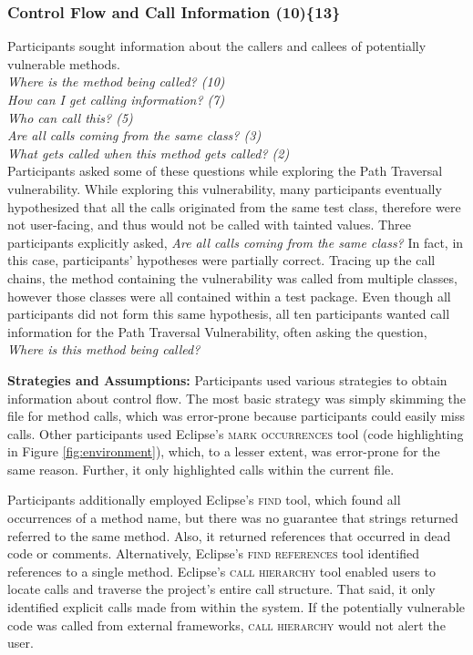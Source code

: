 \documentclass[10pt,journal,compsoc]{IEEEtran}
\begin{document}

\subsubsection{Control Flow and Call Information (10)\{13\}}\label{cf}

Participants sought information about the callers and callees of potentially vulnerable methods.
\\

\noindent\emph{Where is the method being called? (10)} \\
\emph{How can I get calling information? (7)} \\
\emph{Who can call this? (5)} \\
\emph{Are all calls coming from the same class? (3)} \\
\emph{What gets called when this method gets called? (2)}
\\

Participants asked some of these questions while exploring the Path Traversal vulnerability.
While exploring this vulnerability, many participants eventually hypothesized that all the calls originated from the same test class, therefore were not user-facing, and thus would not be called with tainted values.
Three participants explicitly asked, \textit{Are all calls coming from the same class?} 
In fact, in this case, participants' hypotheses were partially correct. 
Tracing up the call chains, the method containing the vulnerability was called from multiple classes, however those classes were all contained within a test package.
Even though all participants did not form this same hypothesis, all ten participants wanted call information for the Path Traversal Vulnerability, often asking the question, \textit{Where is this method being called?} 

 
\textbf{Strategies and Assumptions:}
Participants used various strategies to obtain information about control flow.
The most basic strategy was simply skimming the file for method calls, which was error-prone because participants could easily miss calls.
Other participants used Eclipse's \textsc{mark occurrences} tool (code highlighting in Figure \ref{fig:environment}), which, to a lesser extent, was error-prone for the same reason. 
Further, it only highlighted calls within the current file.

Participants additionally employed Eclipse's \textsc{find} tool, which found all occurrences of a method name, but there was no guarantee that strings returned referred to the same method.
Also, it returned references that occurred in dead code or comments.
Alternatively, Eclipse's \textsc{find references} tool identified references to a single method.
Eclipse's \textsc{call hierarchy} tool enabled users to locate calls and traverse the project's entire call structure.
That said, it only identified explicit calls made from within the system. 
If the potentially vulnerable code was called from external frameworks, \textsc{call hierarchy} would not alert the user.
\end{document}
